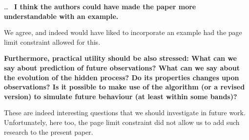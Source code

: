 \documentclass[twoside,11pt]{letter}
\begin{document}
\ldots~
{\bf
I think the authors could have made the paper more understandable with an example. }

We agree, and indeed would have liked to incorporate an example had the page limit constraint allowed for this.

{\bf
Furthermore, practical utility should be also stressed: What can we say about prediction of future observations? What can we say about the evolution of the hidden process? Do its properties changes upon observations? Is it possible to make use of the algorithm (or a revised version) to simulate future behaviour (at least within some bands)? }

These are indeed interesting questions that we should investigate in future work. Unfortunately, here too, the page limit constraint did not allow us to add such research to the present paper.
\end{document}
